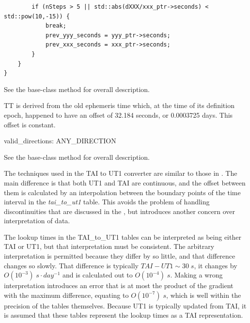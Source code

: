 {\begin{enumerate}
{\begin{enumerate}
\begin{verbatim}
		if (nSteps > 5 || std::abs(dXXX/xxx_ptr->seconds) < std::pow(10,-15)) {
			break;
			prev_yyy_seconds = yyy_ptr->seconds;
			prev_xxx_seconds = xxx_ptr->seconds;
		}
	}
}
\end{verbatim}

See the base-class  method 
for overall description.


\end{enumerate}}


TT is derived from the old ephemeris time which, at the time of its
definition epoch, happened to have an offset of 32.184 seconds, or
0.0003725 days.  This offset is constant.

{\begin{enumerate}
valid\_directions:
ANY\_DIRECTION

See the base-class  method 
for overall description.

\end{enumerate}}



The techniques used in the TAI to UT1 converter are similar to those in 
.  
The main difference is
that both UT1 and TAI are continuous, and the offset between them is
calculated by an interpolation between the boundary points of the time
interval in the \textit{tai\_to\_ut1 }table.  This avoids the problem
of handling discontinuities that are discussed in the 
, but introduces another
concern over interpretation of data.

The lookup times in the TAI\_to\_UT1 tables can be interpreted as being
either TAI or UT1, but that interpretation must be consistent.  The
arbitrary interpretation is permitted because they differ by so little,
and that difference changes so slowly.  That difference is typically
$TAI-UT1 \sim 30 \; s$,
it changes by  $O(10^{-3}) \; s \cdot day^{-1}$ and is calculated out to 
$O(10^{-4}) \; s$.  Making a wrong interpretation introduces an error that
is at most the product of the gradient with the maximum difference,
equating to  $O(10^{-7})\; s$, which is well within the precision of the
tables themselves.  Because UT1 is typically updated from TAI, it is
assumed that these tables represent the lookup times as a TAI
representation.


\end{enumerate}}
